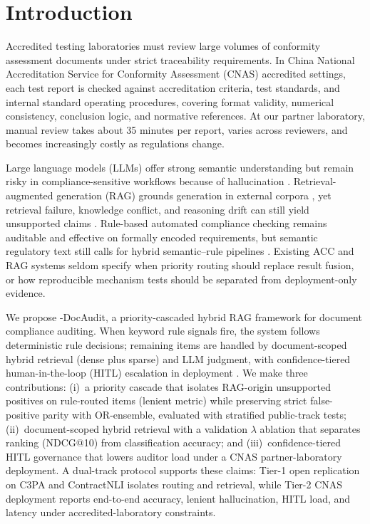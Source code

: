 \section{Introduction}
\label{sec:intro}

Accredited testing laboratories must review large volumes of conformity assessment documents under strict traceability requirements. In China National Accreditation Service for Conformity Assessment (CNAS) accredited settings, each test report is checked against accreditation criteria, test standards, and internal standard operating procedures, covering format validity, numerical consistency, conclusion logic, and normative references. At our partner laboratory, manual review takes about 35 minutes per report, varies across reviewers, and becomes increasingly costly as regulations change.

Large language models (LLMs) offer strong semantic understanding but remain risky in compliance-sensitive workflows because of hallucination \cite{ji2023hallucination,huang2023raghallucination}. Retrieval-augmented generation (RAG) grounds generation in external corpora \cite{lewis2020rag,gao2024ragsurvey}, yet retrieval failure, knowledge conflict, and reasoning drift can still yield unsupported claims \cite{gao2024ragsurvey,huang2023raghallucination}. Rule-based automated compliance checking remains auditable and effective on formally encoded requirements, but semantic regulatory text still calls for hybrid semantic--rule pipelines \cite{solihin2015rules,zhang2016acc,zheng2022acc}. Existing ACC and RAG systems seldom specify when priority routing should replace result fusion, or how reproducible mechanism tests should be separated from deployment-only evidence.

We propose \HRAG{}-DocAudit, a priority-cascaded hybrid RAG framework for document compliance auditing. When keyword rule signals fire, the system follows deterministic rule decisions; remaining items are handled by document-scoped hybrid retrieval (dense plus sparse) and LLM judgment, with confidence-tiered human-in-the-loop (HITL) escalation in deployment \cite{shneiderman2020hcai}. We make three contributions: (i)~a priority cascade that isolates RAG-origin unsupported positives on rule-routed items (lenient metric) while preserving strict false-positive parity with OR-ensemble, evaluated with stratified public-track tests; (ii)~document-scoped hybrid retrieval with a validation $\lambda$ ablation that separates ranking (NDCG@10) from classification accuracy; and (iii)~confidence-tiered HITL governance that lowers auditor load under a CNAS partner-laboratory deployment. A dual-track protocol supports these claims: Tier-1 open replication on C3PA and ContractNLI isolates routing and retrieval, while Tier-2 CNAS deployment reports end-to-end accuracy, lenient hallucination, HITL load, and latency under accredited-laboratory constraints.
